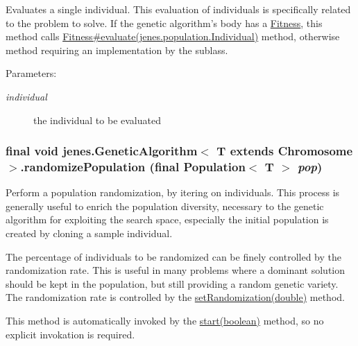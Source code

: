 Evaluates a single individual. This evaluation of individuals is specifically related to the problem to solve. If the genetic algorithm's body has a \hyperlink{}{Fitness}, this method calls \hyperlink{}{Fitness\#evaluate(jenes.population.Individual)} method, otherwise method requiring an implementation by the sublass. 

\begin{Desc}
\item[Parameters:]
\begin{description}
\item[{\em individual}]the individual to be evaluated \end{description}
\end{Desc}
\hypertarget{classjenes_1_1_genetic_algorithm_3_01_t_01extends_01_chromosome_01_4_7824bcf504331528000af8be62073d53}{
\subsubsection[randomizePopulation]{\setlength{\rightskip}{0pt plus 5cm}final void jenes.GeneticAlgorithm$<$ T extends Chromosome $>$.randomizePopulation (final Population$<$ T $>$ {\em pop})}}
\label{classjenes_1_1_genetic_algorithm_3_01_t_01extends_01_chromosome_01_4_7824bcf504331528000af8be62073d53}


Perform a population randomization, by itering on individuals. This process is generally useful to enrich the population diversity, necessary to the genetic algorithm for exploiting the search space, especially the initial population is created by cloning a sample individual. 

The percentage of individuals to be randomized can be finely controlled by the randomization rate. This is useful in many problems where a dominant solution should be kept in the population, but still providing a random genetic variety. The randomization rate is controlled by the \hyperlink{}{setRandomization(double)} method. 

This method is automatically invoked by the \hyperlink{classjenes_1_1_genetic_algorithm_3_01_t_01extends_01_chromosome_01_4_6fd4badfc67b0c2b0d43c6dd4a14875e}{start(boolean)} method, so no explicit invokation is required.

